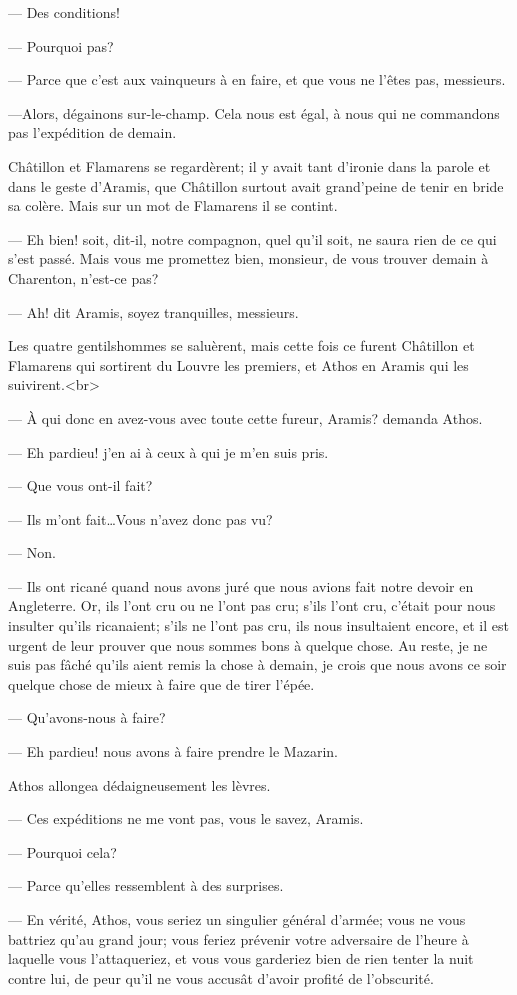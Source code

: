 — Des conditions!

— Pourquoi pas?

— Parce que c'est aux vainqueurs à en faire, et que vous ne l'êtes pas, messieurs.

—Alors, dégainons sur-le-champ. Cela nous est égal, à nous qui ne commandons pas l'expédition de demain.

Châtillon et Flamarens se regardèrent; il y avait tant d'ironie dans la parole et dans le geste d'Aramis, que Châtillon surtout avait grand'peine de tenir en bride sa colère. Mais sur un mot de Flamarens il se contint.

— Eh bien! soit, dit-il, notre compagnon, quel qu'il soit, ne saura rien de ce qui s'est passé. Mais vous me promettez bien, monsieur, de vous trouver demain à Charenton, n'est-ce pas?

— Ah! dit Aramis, soyez tranquilles, messieurs.

Les quatre gentilshommes se saluèrent, mais cette fois ce furent Châtillon et Flamarens qui sortirent du Louvre les premiers, et
Athos en Aramis qui les suivirent.<br> 

— À qui donc en avez-vous avec toute cette fureur, Aramis? demanda Athos.

— Eh pardieu! j'en ai à ceux à qui je m'en suis pris.

— Que vous ont-il fait?

— Ils m'ont fait\dots Vous n'avez donc pas vu?

— Non.

— Ils ont ricané quand nous avons juré que nous avions fait notre devoir en Angleterre. Or, ils l'ont cru ou ne l'ont pas cru; s'ils l'ont cru, c'était pour nous insulter qu'ils ricanaient; s'ils ne l'ont pas cru, ils nous insultaient encore, et il est urgent de leur prouver que nous sommes bons à quelque chose. Au reste, je ne suis pas fâché qu'ils aient remis la chose à demain, je crois que nous avons ce soir quelque chose de mieux à faire que de tirer l'épée.

— Qu'avons-nous à faire?

— Eh pardieu! nous avons à faire prendre le Mazarin.

Athos allongea dédaigneusement les lèvres.

— Ces expéditions ne me vont pas, vous le savez, Aramis.

— Pourquoi cela?

— Parce qu'elles ressemblent à des surprises.

— En vérité, Athos, vous seriez un singulier général d'armée; vous ne vous battriez qu'au grand jour; vous feriez prévenir votre adversaire de l'heure à laquelle vous l'attaqueriez, et vous vous garderiez bien de rien tenter la nuit contre lui, de peur qu'il ne vous accusât d'avoir profité de l'obscurité.


